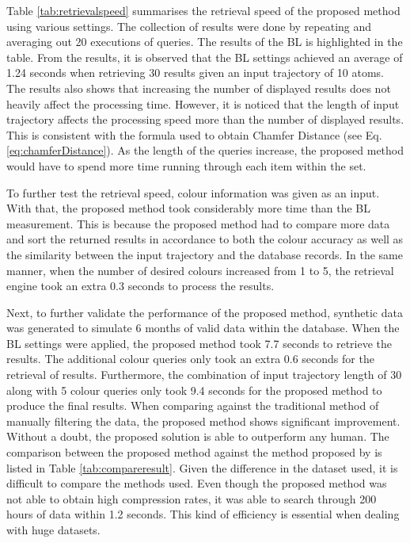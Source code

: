 Table \ref{tab:retrievalspeed} summarises the retrieval speed of the proposed
method using various settings. The collection of results were done by repeating
and averaging out 20 executions of queries. The results of the BL is highlighted
in the table. From the results, it is observed that the BL settings achieved an
average of 1.24 seconds when retrieving 30 results given an input trajectory of
10 atoms. The results also shows that increasing the number of displayed
results does not heavily affect the processing time. However, it is noticed
that the length of input trajectory affects the processing speed more than the
number of displayed results. This is consistent with the formula used to obtain
Chamfer Distance (see Eq. \ref{eq:chamferDistance}). As the length of the
queries increase, the proposed method would have to spend more time running
through each item within the set.

To further test the retrieval speed, colour information was given as an input.
With that, the proposed method took considerably more time than the BL
measurement. This is because the proposed method had to compare more data and
sort the returned results in accordance to both the colour accuracy as well as
the similarity between the input trajectory and the database records. In the
same manner, when the number of desired colours increased from 1 to 5, the
retrieval engine took an extra 0.3 seconds to process the results.

Next, to further validate the performance of the proposed method, synthetic
data was generated to simulate 6 months of valid data within the database.
When the BL settings were applied, the proposed method took 7.7 seconds to
retrieve the results. The additional colour queries only took an extra 0.6
seconds for the retrieval of results. Furthermore, the combination of input
trajectory length of 30 along with 5 colour queries only took 9.4 seconds for
the proposed method to produce the final results. When comparing against the
traditional method of manually filtering the data, the proposed method shows
significant improvement. Without a doubt, the proposed solution is able to
outperform any human. The comparison between the proposed method against the
method proposed by  is listed in
Table \ref{tab:compareresult}. Given the difference in the dataset used, it is
difficult to compare the methods used. Even though the proposed method was not
able to obtain high compression rates, it was able to search through 200 hours
of data within 1.2 seconds. This kind of efficiency is essential when dealing
with huge datasets.


